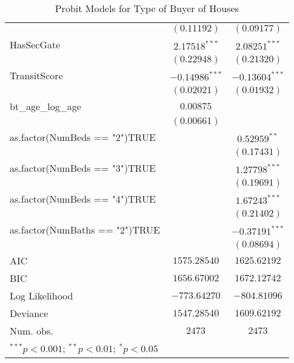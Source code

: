 \begin{table}
\begin{center}
\begin{tabular}{l c c}
                               & $(0.11192)$      & $(0.09177)$      \\
HasSecGate                     & $2.17518^{***}$  & $2.08251^{***}$  \\
                               & $(0.22948)$      & $(0.21320)$      \\
TransitScore                   & $-0.14986^{***}$ & $-0.13604^{***}$ \\
                               & $(0.02021)$      & $(0.01932)$      \\
bt\_age\_log\_age              & $0.00875$        &                  \\
                               & $(0.00661)$      &                  \\
as.factor(NumBeds == "2")TRUE  &                  & $0.52959^{**}$   \\
                               &                  & $(0.17431)$      \\
as.factor(NumBeds == "3")TRUE  &                  & $1.27798^{***}$  \\
                               &                  & $(0.19691)$      \\
as.factor(NumBeds == "4")TRUE  &                  & $1.67243^{***}$  \\
                               &                  & $(0.21402)$      \\
as.factor(NumBaths == "2")TRUE &                  & $-0.37191^{***}$ \\
                               &                  & $(0.08694)$      \\
\hline
AIC                            & $1575.28540$     & $1625.62192$     \\
BIC                            & $1656.67002$     & $1672.12742$     \\
Log Likelihood                 & $-773.64270$     & $-804.81096$     \\
Deviance                       & $1547.28540$     & $1609.62192$     \\
Num. obs.                      & $2473$           & $2473$           \\
\hline
\multicolumn{3}{l}{\scriptsize{$^{***}p<0.001$; $^{**}p<0.01$; $^{*}p<0.05$}}
\end{tabular}
\caption{Probit Models for Type of Buyer of Houses}
\label{tab:reg_probit}
\end{center}
\end{table}
